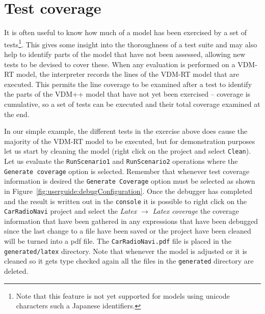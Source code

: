 
\section{Test coverage}\label{sec:testcov}

It is often useful to know how much of a model has been exercised by a
set of tests\footnote{Note that this feature is not yet supported for
  models using unicode characters such a Japanese identifiers.}. 
This gives some insight into the thoroughness of a test
suite and may also help to identify parts of the model that have not
been assessed, allowing new tests to be devised to cover these. When
any evaluation is performed on a VDM-RT model, the interpreter records
the lines of the VDM-RT model that are executed. This permits the line
coverage to be examined after a test to identify the parts of the
VDM++ model that have not yet been exercised -- coverage is
cumulative, so a set of tests can be executed and their total coverage
examined at the end.

In our simple example, the different tests in the exercise above does
cause the majority of the VDM-RT model to be executed, but for
demonstration purposes let us start by cleaning the model (right click
on the project and select \texttt{Clean}). Let us evaluate the
\texttt{RunScenario1} and \texttt{RunScenario2} operations where the
\texttt{Generate coverage} option is selected. 
Remember that whenever test coverage
information is desired the \texttt{Generate Coverage} option
must be selected as shown in Figure~\ref{fig:userguide:debugConfiguration}. 
 Once the debugger
has completed and the result is written out in the \texttt{console} it
is possible to right click on the \texttt{CarRadioNavi} project and
select the \emph{Latex} $ \rightarrow $ \emph{Latex coverage} the
coverage information that have been gathered in any expressions that
have been debugged since the last change to a file have been saved or
the project have been cleaned will be turned into a pdf file. The
\texttt{CarRadioNavi.pdf} file is placed in the
\texttt{generated/latex} directory. Note that whenever the model is
adjusted or it is cleaned so it gets type checked again all the files
in the \texttt{generated} directory are deleted.

